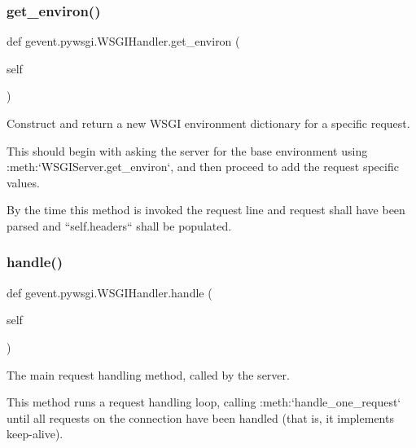 \subsubsection{\texorpdfstring{get\+\_\+environ()}{get\_environ()}}
{\footnotesize\ttfamily def gevent.\+pywsgi.\+W\+S\+G\+I\+Handler.\+get\+\_\+environ (\begin{DoxyParamCaption}\item[{}]{self }\end{DoxyParamCaption})}

\begin{DoxyVerb}Construct and return a new WSGI environment dictionary for a specific request.

This should begin with asking the server for the base environment
using :meth:`WSGIServer.get_environ`, and then proceed to add the
request specific values.

By the time this method is invoked the request line and request shall have
been parsed and ``self.headers`` shall be populated.
\end{DoxyVerb}
 \mbox{\label{classgevent_1_1pywsgi_1_1_w_s_g_i_handler_ab9d9fd3d969d84ea207bdf24ef98f695}} 
\subsubsection{\texorpdfstring{handle()}{handle()}}
{\footnotesize\ttfamily def gevent.\+pywsgi.\+W\+S\+G\+I\+Handler.\+handle (\begin{DoxyParamCaption}\item[{}]{self }\end{DoxyParamCaption})}

\begin{DoxyVerb}The main request handling method, called by the server.

This method runs a request handling loop, calling
:meth:`handle_one_request` until all requests on the
connection have been handled (that is, it implements
keep-alive).
\end{DoxyVerb}
 \mbox{\label{classgevent_1_1pywsgi_1_1_w_s_g_i_handler_a504e8333143cc425676c0ac25fba352b}} 
